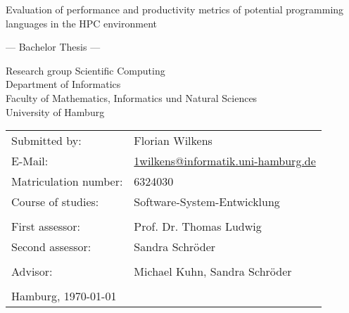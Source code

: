 \begin{titlepage}
    \begin{center}
        {\titlefont\huge Evaluation of performance and productivity metrics of
            potential programming languages in the HPC environment \par}

        \bigskip
        \bigskip

        {\titlefont\Large --- Bachelor Thesis ---\par}

        \bigskip
        \bigskip

        {\large Research group Scientific Computing \\
        Department of Informatics \\
        Faculty of Mathematics, Informatics und Natural Sciences \\
        University of Hamburg\par}
    \end{center}

    \vfill

    {\large \begin{tabular}{ll}
        Submitted by: & Florian Wilkens \\
        E-Mail: & \href{mailto:1wilkens@informatik.uni-hamburg.de}
            {1wilkens@informatik.uni-hamburg.de} \\
        Matriculation number: & 6324030 \\
        Course of studies: & Software-System-Entwicklung \\
        \\
        First assessor: & Prof. Dr. Thomas Ludwig \\
        Second assessor: & Sandra Schr\"oder \\ \\
        Advisor: & Michael Kuhn, Sandra Schr\"oder \\
        \\
        Hamburg, \today
    \end{tabular}\par}
\end{titlepage}
